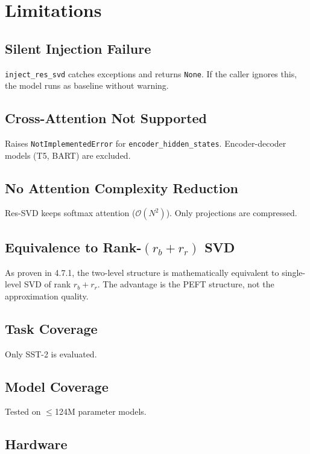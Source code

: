 \section{Limitations}

\subsection{Silent Injection Failure}

\texttt{inject\_res\_svd} catches exceptions and returns \texttt{None}. If the caller 
ignores this, the model runs as baseline without warning.

\subsection{Cross-Attention Not Supported}

Raises \texttt{NotImplementedError} for \texttt{encoder\_hidden\_states}. Encoder-decoder 
models (T5, BART) are excluded.

\subsection{No Attention Complexity Reduction}

Res-SVD keeps softmax attention ($\mathcal{O}(N^2)$). Only projections are 
compressed.

\subsection{Equivalence to Rank-$(r_b+r_r)$ SVD}

As proven in  4.7.1, the two-level structure is mathematically equivalent 
to single-level SVD of rank $r_b + r_r$. The advantage is the PEFT 
structure, not the approximation quality.

\subsection{Task Coverage}

Only SST-2 is evaluated.

\subsection{Model Coverage}

Tested on $\le$124M parameter models.

\subsection{Hardware}

